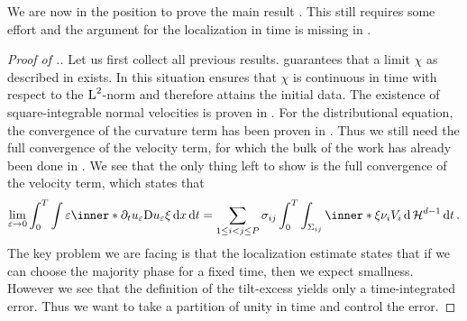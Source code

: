 We are now in the position to prove the main result 
. This still requires some effort and the 
argument for the localization in time is missing in 
\cite{convergence_of_allen_cahn_equation_to_multiphase_mean_curvature_flow}.

\begin{proof}[Proof of .]
	Let us first collect all previous results.
	 guarantees that a limit $ \chi 
	$  as described in  exists.
	In this situation  
	ensures that 
	$ \chi $ is continuous in time with respect to the $ \operatorname{L}^{ 2 } $-norm and 
	therefore attains the initial data. The existence of square-integrable 
	normal velocities is proven in 
	.
	For the 
	distributional equation, the convergence of the curvature term has been 
	proven in
	. 
	Thus we still need the full 
	convergence of the velocity term, for which the bulk of the work has 
	already been 
	done in .
	We see that the only thing left to show is the full convergence 
	of the velocity term, which states that
	\begin{equation*}
		\lim_{ \varepsilon \to 0 }
		\int_{ 0 }^{ T }
		\int
		\varepsilon
		\inner*{ \partial_{ t } u_{ 
				\varepsilon } }{ \diff u_{ \varepsilon } \xi }
		\dd{ x }
		\dd{ t }
		=
		\sum_{ 1 \leq i < j \leq P }
		\sigma_{ i j }
		\int_{ 0 }^{ T }
		\int_{ \Sigma_{ i j } }
		\inner*{ \xi }{ \nu_{ i } }
		V_{ i }
		\dd{ \hm^{ d - 1 } }
		\dd{ t }.
	\end{equation*} 
	The key problem we are facing is that the localization estimate 
	 states that if we can choose the 
	majority phase for a fixed time, then we expect smallness. However we see 
	that the definition of the tilt-excess yields only a time-integrated error. 
	Thus we want to take a partition of unity in time and control the 
	error.
	

\end{proof}
